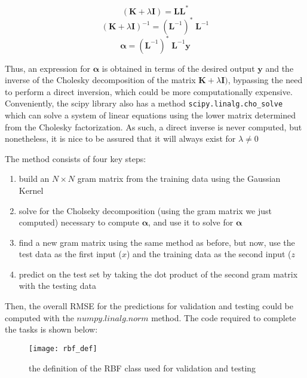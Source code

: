 \documentclass{article}
\begin{document}
\begin{equation}
(\mathbf{K} + \lambda \mathbf{I}) = \mathbf{L} \mathbf{L}^*
\end{equation}
\begin{equation}
(\mathbf{K} + \lambda \mathbf{I})^{-1} = (\mathbf{L}^{-1})^* \;\mathbf{L}^{-1}
\end{equation}
\begin{equation}
\boldsymbol\alpha = (\mathbf{L}^{-1})^* \;\mathbf{L}^{-1} \mathbf{y}
\end{equation}

Thus, an expression for $\boldsymbol\alpha$ is obtained in terms of the desired output $\mathbf{y}$ and the inverse of the Cholesky decomposition of the matrix $\mathbf{K} + \lambda \mathbf{I})$, bypassing the need to perform a direct inversion, which could be more computationally expensive. Conveniently, the scipy library also has a method \verb+scipy.linalg.cho_solve+ which can solve a system of linear equations using the lower matrix determined from the Cholesky factorization. As such, a direct inverse is never computed, but nonetheless, it is nice to be assured that it will always exist for $\lambda \neq 0$

The method consists of four key steps:
\begin{enumerate}
\item build an $N \times N$ gram matrix from the training data using the Gaussian Kernel
\item solve for the Cholseky decomposition (using the gram matrix we just computed) necessary to compute $\boldsymbol\alpha$, and use it to solve for $\boldsymbol\alpha$
\item find a new gram matrix using the same method as before, but now, use the test data as the first input ($x$) and the training data as the second input ($z$
\item predict on the test set by taking the dot product of the second gram matrix with the testing data
\end{enumerate}

Then, the overall RMSE for the predictions for validation and testing could be computed with the $numpy.linalg.norm$ method. The code required to complete the tasks is shown below:


\begin{figure}[H]
\centering
\texttt{[image: rbf\_def]}
\caption{the definition of the RBF class used for validation and testing}
\end{figure}
\end{document}
